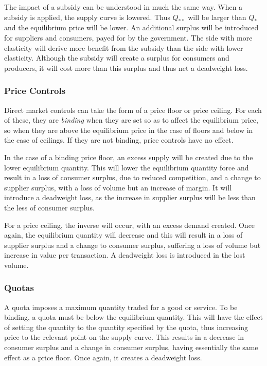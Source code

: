 \documentclass[12pt]{report}
\begin{document}
\begin{flushleft}
\bigskip
The impact of a subsidy can be understood in much the same way. When a subsidy
is applied, the supply curve is lowered. Thus \(Q_{**}\) will be larger than 
\(Q_*\) and the equilibrium price will be lower. An additional surplus will be 
introduced for suppliers and consumers, payed for by the government. The side 
with more elasticity will derive more benefit from the subsidy than the side 
with lower elasticity. Although the subsidy will create a surplus for consumers
and producers, it will cost more than this surplus and thus net a deadweight 
loss.

\subsubsection*{Price Controls}
Direct market controls can take the form of a price floor or price ceiling.
For each of these, they are \textit{binding} when they are set so as to affect
the equilibrium price, so when they are above the equilibrium price in the case
of floors and below in the case of ceilings. If they are not binding, price
controls have no effect.

\bigskip
In the case of a binding price floor, an excess supply will be created due
to the lower equilibrium quantity. This will lower the equilibrium quantity 
force and result in a loss of consumer surplus, due to reduced competition, 
and a change to supplier surplus, with a loss of volume but an increase of 
margin. It will introduce a deadweight loss, as the increase in supplier 
surplus will be less than the less of consumer surplus.

\bigskip
For a price ceiling, the inverse will occur, with an excess demand created.
Once again, the equilibrium quantity will decrease and this will result in
a loss of supplier surplus and a change to consumer surplus, suffering a
loss of volume but increase in value per transaction. A deadweight loss is
introduced in the lost volume.

\subsubsection*{Quotas}
A quota imposes a maximum quantity traded for a good or service. To be 
binding, a quota must be below the equilibrium quantity. This will have the
effect of setting the quantity to the quantity specified by the quota,
thus increasing price to the relevant point on the supply curve. This
results in a decrease in consumer surplus and a change in consumer surplus,
having essentially the same effect as a price floor. Once again, it creates
a deadweight loss.


\end{flushleft}
\end{document}

